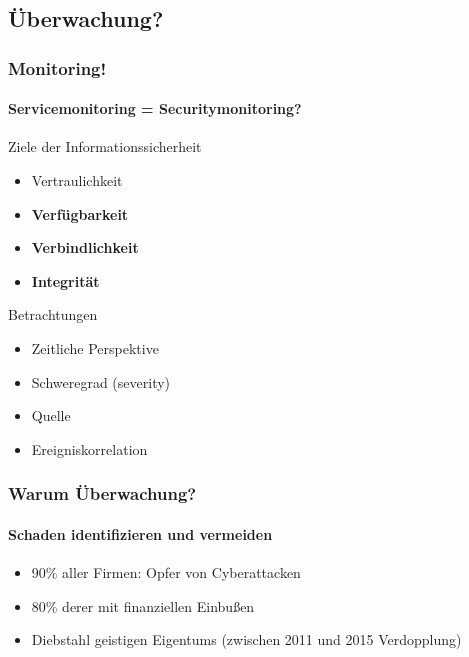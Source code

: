 
\subsection{Überwachung?}
\begin{frame}
    \frametitle{Monitoring!}
    \framesubtitle{Servicemonitoring = Securitymonitoring?}
    
    \pause
    
   \begin{exampleblock}{Ziele der Informationssicherheit}
        \begin{itemize}
            \item   Vertraulichkeit
            \item   \textbf{Verfügbarkeit}
            \item   \textbf{Verbindlichkeit}
            \item   \textbf{Integrität}  
        \end{itemize}     
   \end{exampleblock}
    \pause
    \begin{exampleblock}{Betrachtungen}
        \begin{itemize}
            \item Zeitliche Perspektive
            \item Schweregrad (severity)
            \item Quelle
            \item Ereigniskorrelation
        \end{itemize} 
    \end{exampleblock}
            
\end{frame}

\begin{frame}
\frametitle{Warum Überwachung?}
\framesubtitle{Schaden identifizieren und vermeiden}

    \begin{itemize}
        \item 90\% aller Firmen: Opfer von Cyberattacken
        \vspace{0.5cm}
        \item 80\% derer mit finanziellen Einbußen
        \vspace{0.5cm}
        \item Diebstahl geistigen Eigentums (zwischen 2011 und 2015 Verdopplung) 
    \end{itemize}

\end{frame}

